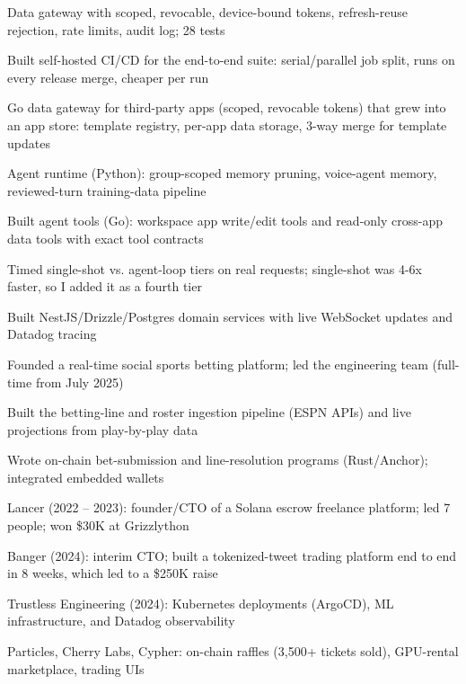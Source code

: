 \documentclass[print]{jack-resume}
\begin{document}
\begin{tightemize}
    \item Data gateway with scoped, revocable, device-bound tokens, refresh-reuse rejection, rate limits, audit log; 28 tests
    \item Built self-hosted CI/CD for the end-to-end suite: serial/parallel job split, runs on every release merge, cheaper per run
    \item Go data gateway for third-party apps (scoped, revocable tokens) that grew into an app store: template registry, per-app data storage, 3-way merge for template updates
    \item Agent runtime (Python): group-scoped memory pruning, voice-agent memory, reviewed-turn training-data pipeline
    \item Built agent tools (Go): workspace app write/edit tools and read-only cross-app data tools with exact tool contracts
    \item Timed single-shot vs. agent-loop tiers on real requests; single-shot was 4-6x faster, so I added it as a fourth tier
\end{tightemize}
\sectionsep

\begin{tightemize}
    \item Built NestJS/Drizzle/Postgres domain services with live WebSocket updates and Datadog tracing
    \item Founded a real-time social sports betting platform; led the engineering team (full-time from July 2025)
    \item Built the betting-line and roster ingestion pipeline (ESPN APIs) and live projections from play-by-play data
    \item Wrote on-chain bet-submission and line-resolution programs (Rust/Anchor); integrated embedded wallets
\end{tightemize}
\sectionsep

\begin{tightemize}
    \item Lancer (2022 – 2023): founder/CTO of a Solana escrow freelance platform; led 7 people; won \$30K at Grizzlython
    \item Banger (2024): interim CTO; built a tokenized-tweet trading platform end to end in 8 weeks, which led to a \$250K raise
    \item Trustless Engineering (2024): Kubernetes deployments (ArgoCD), ML infrastructure, and Datadog observability
    \item Particles, Cherry Labs, Cypher: on-chain raffles (3,500+ tickets sold), GPU-rental marketplace, trading UIs
\end{tightemize}
\sectionsep
\end{document}
